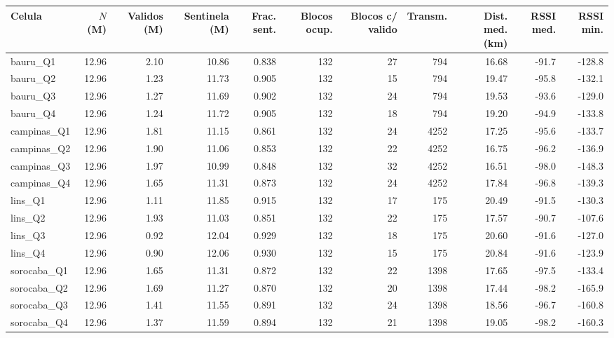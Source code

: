 \begin{tabular}{lrrrrrrrrrr}
\hline
Celula & $N$ (M) & Validos (M) & Sentinela (M) & Frac. sent. & Blocos ocup. & Blocos c/ valido & Transm. & Dist. med. (km) & RSSI med. & RSSI min. \\
\hline
bauru\_Q1 & 12.96 & 2.10 & 10.86 & 0.838 & 132 & 27 & 794 & 16.68 & -91.7 & -128.8 \\
bauru\_Q2 & 12.96 & 1.23 & 11.73 & 0.905 & 132 & 15 & 794 & 19.47 & -95.8 & -132.1 \\
bauru\_Q3 & 12.96 & 1.27 & 11.69 & 0.902 & 132 & 24 & 794 & 19.53 & -93.6 & -129.0 \\
bauru\_Q4 & 12.96 & 1.24 & 11.72 & 0.905 & 132 & 18 & 794 & 19.20 & -94.9 & -133.8 \\
campinas\_Q1 & 12.96 & 1.81 & 11.15 & 0.861 & 132 & 24 & 4252 & 17.25 & -95.6 & -133.7 \\
campinas\_Q2 & 12.96 & 1.90 & 11.06 & 0.853 & 132 & 22 & 4252 & 16.75 & -96.2 & -136.9 \\
campinas\_Q3 & 12.96 & 1.97 & 10.99 & 0.848 & 132 & 32 & 4252 & 16.51 & -98.0 & -148.3 \\
campinas\_Q4 & 12.96 & 1.65 & 11.31 & 0.873 & 132 & 24 & 4252 & 17.84 & -96.8 & -139.3 \\
lins\_Q1 & 12.96 & 1.11 & 11.85 & 0.915 & 132 & 17 & 175 & 20.49 & -91.5 & -130.3 \\
lins\_Q2 & 12.96 & 1.93 & 11.03 & 0.851 & 132 & 22 & 175 & 17.57 & -90.7 & -107.6 \\
lins\_Q3 & 12.96 & 0.92 & 12.04 & 0.929 & 132 & 18 & 175 & 20.60 & -91.6 & -127.0 \\
lins\_Q4 & 12.96 & 0.90 & 12.06 & 0.930 & 132 & 15 & 175 & 20.84 & -91.6 & -123.9 \\
sorocaba\_Q1 & 12.96 & 1.65 & 11.31 & 0.872 & 132 & 22 & 1398 & 17.65 & -97.5 & -133.4 \\
sorocaba\_Q2 & 12.96 & 1.69 & 11.27 & 0.870 & 132 & 20 & 1398 & 17.44 & -98.2 & -165.9 \\
sorocaba\_Q3 & 12.96 & 1.41 & 11.55 & 0.891 & 132 & 24 & 1398 & 18.56 & -96.7 & -160.8 \\
sorocaba\_Q4 & 12.96 & 1.37 & 11.59 & 0.894 & 132 & 21 & 1398 & 19.05 & -98.2 & -160.3 \\
\hline
\end{tabular}
